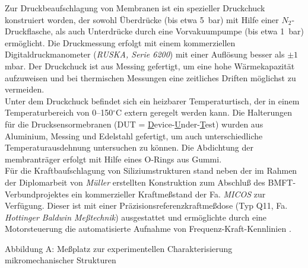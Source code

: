 Zur Druckbeaufschlagung von Membranen ist ein spezieller Druckchuck
konstruiert worden, der sowohl Überdrücke (bis etwa 5~bar) mit Hilfe einer
$N_{2}$-Druckflasche, als auch Unterdrücke durch eine Vorvakuumpumpe
(bis etwa 1~bar) ermöglicht. Die Druckmessung erfolgt mit einem
kommerziellen Digitaldruckmanometer ({\em RUSKA, Serie 6200}) mit einer
Auflösung besser als $\pm1$ mbar. Der Druckchuck ist aus Messing gefertigt,
um eine hohe Wärmekapazität aufzuweisen und bei thermischen Messungen
eine zeitliches Driften möglichst zu vermeiden. \\

Unter dem Druckchuck befindet sich ein heizbarer Temperaturtisch, der in
einem Temperaturbereich von 0--150$^\circ$C extern geregelt werden kann.
Die Halterungen für die Drucksensormebranen
(DUT = \underline{D}evice-\underline{U}nder-\underline{T}est)
wurden aus Aluminium, Messing und Edelstahl gefertigt, um auch
unterschiedliche Temperaturausdehnung untersuchen zu können. Die
Abdichtung der membranträger erfolgt mit Hilfe eines O-Rings aus Gummi.\\
%
Für die Kraftbaufschlagung von Siliziumstrukturen stand neben der
im Rahmen der Diplomarbeit von {\sl Müller} erstellten Konstruktion
\cite{Mue92} zum Abschluß des BMFT-Verbundprojektes ein kommerzieller
Kraftmeßstand der Fa. {\em MICOS} zur Verfügung. Dieser ist mit einer
Präzisionsreferenzkraftmeßdose (Typ Q11, Fa. {\em Hottinger Baldwin
Meßtechnik}) ausgestattet und ermöglichte durch eine Motorsteuerung die
automatisierte Aufnahme von Frequenz-Kraft-Kennlinien \cite{Wag94}.

\newpage

Abbildung A: Meßplatz zur experimentellen Charakterisierung
mikromechanischer Strukturen\\
